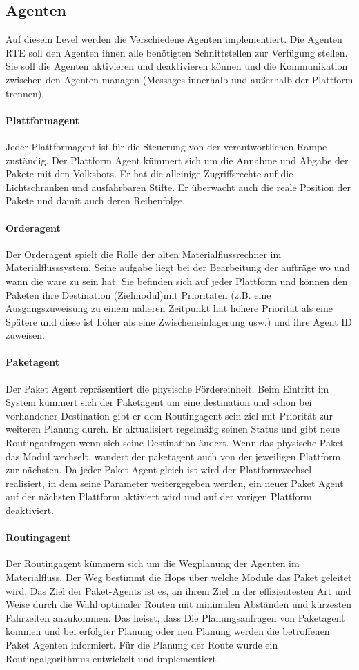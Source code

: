 \subsection{Agenten}
Auf diesem Level werden die Verschiedene Agenten implementiert. Die Agenten RTE soll den Agenten ihnen alle benötigten Schnittstellen zur
Verfügung stellen. Sie soll die Agenten aktivieren und deaktivieren können und die Kommunikation zwischen den Agenten managen
(Messages innerhalb und außerhalb der Plattform trennen)\cite[S. 26]{Stasch:Hahn}. 
\paragraph{Plattformagent}
Jeder Plattformagent ist für die Steuerung von der verantwortlichen Rampe zuständig.
Der Plattform Agent kümmert sich um die Annahme und Abgabe der Pakete mit den Volksbots. Er
hat die alleinige Zugriffsrechte auf die Lichtschranken und ausfahrbaren Stifte. Er überwacht auch die reale Position 
der Pakete und damit auch deren Reihenfolge.
\paragraph{Orderagent}
Der Orderagent spielt die Rolle der alten Materialflussrechner im Materialflusssystem. Seine aufgabe liegt bei der Bearbeitung der aufträge
wo und wann die ware zu sein hat. Sie befinden sich auf jeder Plattform und können den Paketen ihre Destination (Zielmodul)mit Prioritäten (z.B.
eine Ausgangszuweisung zu einem näheren Zeitpunkt hat höhere Priorität als eine Spätere und diese ist höher als eine Zwischeneinlagerung usw.) 
und ihre Agent ID zuweisen\cite[S. 30]{Stasch:Hahn}. 
\paragraph{Paketagent}
Der Paket Agent repräsentiert die physische Fördereinheit. Beim Eintritt im System kümmert sich der Paketagent um 
eine destination und schon bei vorhandener Destination gibt er dem Routingagent sein ziel mit Priorität zur weiteren Planung durch.
Er aktualisiert regelmäßg seinen Status und gibt neue Routinganfragen wenn sich seine Destination ändert.
Wenn das physische Paket das Modul wechselt, wandert der paketagent auch von der jeweiligen Plattform zur nächsten. 
Da jeder Paket Agent gleich ist wird der Plattformwechsel realisiert, in dem seine Parameter weitergegeben
werden, ein neuer Paket Agent auf der nächsten Plattform aktiviert wird und auf der vorigen Plattform deaktiviert\cite[S. 31]{Stasch:Hahn}.
\paragraph{Routingagent}
Der Routingagent kümmern sich um die Wegplanung der Agenten im Materialfluss. Der Weg bestimmt die Hops über welche Module das Paket geleitet wird.
Das Ziel der Paket-Agents ist es, an ihrem Ziel in der effizientesten Art und Weise durch die Wahl optimaler Routen 
mit minimalen Abständen und kürzesten Fahrzeiten anzukommen. Das heisst, dass Die Planungsanfragen
von Paketagent kommen und bei erfolgter Planung oder neu Planung werden die betroffenen Paket Agenten informiert. Für die Planung der 
Route wurde ein Routingalgorithmus entwickelt und implementiert.
